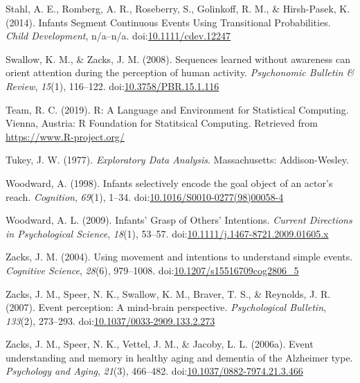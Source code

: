 \documentclass[
  english,
  man,floatsintext]{apa6}
\newlength{\cslhangindent}
\newenvironment{cslreferences}%
  {\setlength{\parindent}{0pt}%
  \everypar{\setlength{\hangindent}{\cslhangindent}}\ignorespaces}%
  {\par}
\begin{document}
\begin{cslreferences}
\leavevmode\hypertarget{ref-stahl_2014}{}%
Stahl, A. E., Romberg, A. R., Roseberry, S., Golinkoff, R. M., \& Hirsh-Pasek, K. (2014). Infants Segment Continuous Events Using Transitional Probabilities. \emph{Child Development}, n/a--n/a. doi:\href{https://doi.org/10.1111/cdev.12247}{10.1111/cdev.12247}

\leavevmode\hypertarget{ref-swallow_zacks_2008}{}%
Swallow, K. M., \& Zacks, J. M. (2008). Sequences learned without awareness can orient attention during the perception of human activity. \emph{Psychonomic Bulletin \& Review}, \emph{15}(1), 116--122. doi:\href{https://doi.org/10.3758/PBR.15.1.116}{10.3758/PBR.15.1.116}

\leavevmode\hypertarget{ref-r}{}%
Team, R. C. (2019). R: A Language and Environment for Statistical Computing. Vienna, Austria: R Foundation for Statitsical Computing. Retrieved from \url{https://www.R-project.org/}

\leavevmode\hypertarget{ref-tukey_1977}{}%
Tukey, J. W. (1977). \emph{Exploratory Data Analysis}. Massachusetts: Addison-Wesley.

\leavevmode\hypertarget{ref-woodward_1998}{}%
Woodward, A. (1998). Infants selectively encode the goal object of an actor's reach. \emph{Cognition}, \emph{69}(1), 1--34. doi:\href{https://doi.org/10.1016/S0010-0277(98)00058-4}{10.1016/S0010-0277(98)00058-4}

\leavevmode\hypertarget{ref-woodward_2009}{}%
Woodward, A. L. (2009). Infants' Grasp of Others' Intentions. \emph{Current Directions in Psychological Science}, \emph{18}(1), 53--57. doi:\href{https://doi.org/10.1111/j.1467-8721.2009.01605.x}{10.1111/j.1467-8721.2009.01605.x}

\leavevmode\hypertarget{ref-zacks_2004}{}%
Zacks, J. M. (2004). Using movement and intentions to understand simple events. \emph{Cognitive Science}, \emph{28}(6), 979--1008. doi:\href{https://doi.org/10.1207/s15516709cog2806_5}{10.1207/s15516709cog2806\_5}

\leavevmode\hypertarget{ref-zacks_2007}{}%
Zacks, J. M., Speer, N. K., Swallow, K. M., Braver, T. S., \& Reynolds, J. R. (2007). Event perception: A mind-brain perspective. \emph{Psychological Bulletin}, \emph{133}(2), 273--293. doi:\href{https://doi.org/10.1037/0033-2909.133.2.273}{10.1037/0033-2909.133.2.273}

\leavevmode\hypertarget{ref-zacks_2006a}{}%
Zacks, J. M., Speer, N. K., Vettel, J. M., \& Jacoby, L. L. (2006a). Event understanding and memory in healthy aging and dementia of the Alzheimer type. \emph{Psychology and Aging}, \emph{21}(3), 466--482. doi:\href{https://doi.org/10.1037/0882-7974.21.3.466}{10.1037/0882-7974.21.3.466}


\end{cslreferences}
\end{document}
